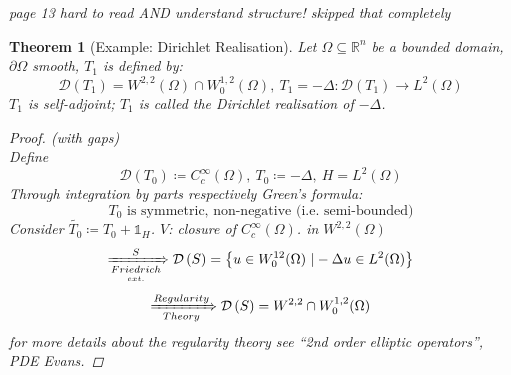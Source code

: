 \documentclass[12pt]{extreport} %
\newcommand{\R}{\mathbb{R}}
\newcommand{\DO}[1]{\mathcal{D}\left( {#1} \right)}
\theoremstyle{named}
\theoremstyle{nnamed}
\theoremstyle{itshape}
\newtheorem{theorem}{Theorem}  \counterwithin{theorem}{chapter}
\theoremstyle{normal}
\begin{document}
				\begin{center}
					\textit{\color{red} page 13 hard to read AND understand structure! skipped that completely}
				\end{center} %
\begin{theorem}[Example: Dirichlet Realisation]
	Let $\Omega \subseteq \R^n$ be a bounded domain, $\partial \Omega$ smooth, $T_1$ is defined by:
	$$ \DO{T_1} = W^{2,2}(\Omega) \cap W_{0}^{1,2}(\Omega), ~ T_1 = - \Delta \colon \DO{T_1} \rightarrow L^2(\Omega) $$
	$T_1$ is self-adjoint; $T_1$ is called the Dirichlet realisation of $-\Delta$.
	
	\begin{proof}(with gaps) ~\\
		Define 
		$$ \DO{T_0} \coloneqq C_c^\infty(\Omega), ~ T_0 \coloneqq - \Delta, ~ H = L^2(\Omega) $$
		Through integration by parts respectively Green's formula:
		$$ T_0 \text{ is symmetric, non-negative (i.e. semi-bounded)} $$
		Consider $\tilde{T_0} \coloneqq T_0 + \mathds{1}_H$. $V$: closure of $C_c^\infty(\Omega)$. in $W^{2,2}(\Omega)$
		$$ \xRightarrow[\underset{ext.}{Friedrich}]{S} \DO{S} = \big\{ u \in W_0^{12}(\Omega) ~| -\Delta u \in L^2(\Omega) \big\} $$
		$$ \xRightarrow[Theory]{Regularity} \DO{S} = W^{2,2} \cap W_0^{1,2}(\Omega) $$
		for more details about the regularity theory see \enquote{2nd order elliptic operators}, PDE Evans.
	\end{proof}
\end{theorem} \newpage
\end{document}
